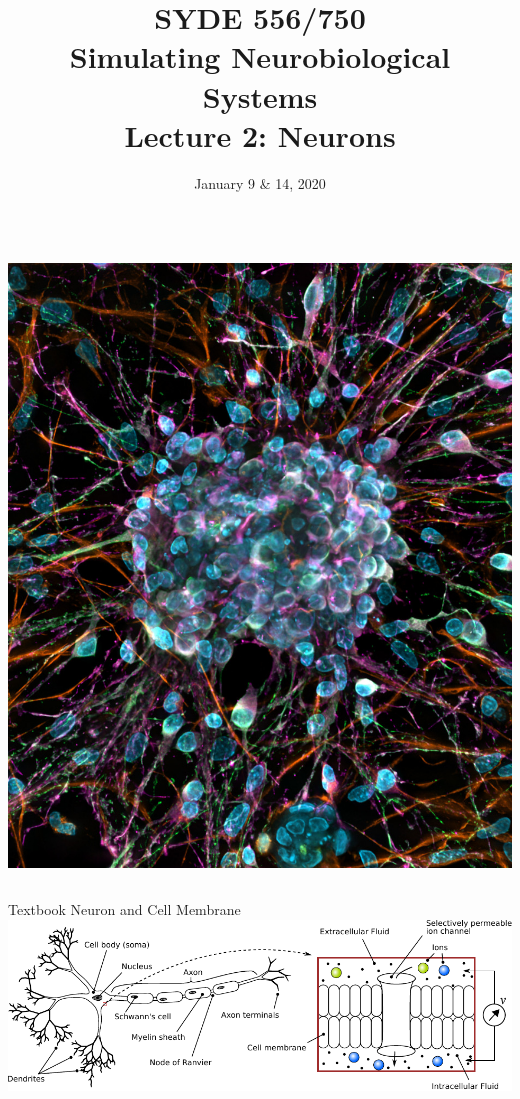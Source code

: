 \documentclass[handout,aspectratio=169]{beamer}
\date{January 9 \& 14, 2020}
\title{SYDE 556/750 \\ Simulating Neurobiological Systems \\ Lecture 2: Neurons}
\begin{document}
	
\begin{frame}{}
	\vspace{0.5cm}
	\begin{columns}[c]
		\MakeTitle
		\includegraphics[width=\textwidth]{media/Rat_primary_cortical_neuron_culture_deconvolved_z-stack_overlay_(30614937102)_small.jpg}
	\end{columns}
\end{frame}

\begin{frame}{Textbook Neuron and Cell Membrane}
	\includegraphics[width=\textwidth]{media/neuron_sketch_membrane.pdf}
\end{frame}
\end{document}
